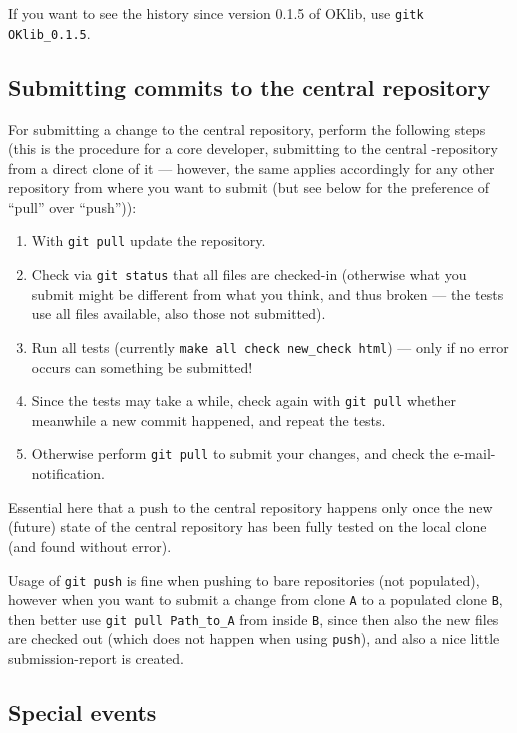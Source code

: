 \documentclass{book}
\begin{document}
If you want to see the history since version 0.1.5 of OKlib, use \texttt{gitk OKlib\_0.1.5}. 




\subsection{Submitting commits to the central repository}
\label{sec:GitSubmittingchanges}

For submitting a change to the central repository, perform the following steps (this is the procedure for a core developer, submitting to the central \OKlibrary-repository from a direct clone of it --- however, the same applies accordingly for any other repository from where you want to submit (but see below for the preference of ``pull'' over ``push'')):
\begin{enumerate}
\item With \texttt{git pull} update the repository.
\item Check via \texttt{git status} that all files are checked-in (otherwise what you submit might be different from what you think, and thus broken --- the tests use all files available, also those not submitted).
\item Run all tests (currently \texttt{make all check new\_check html}) --- only if no error occurs can something be submitted!
\item Since the tests may take a while, check again with \texttt{git pull} whether meanwhile a new commit happened, and repeat the tests.
\item Otherwise perform \texttt{git pull} to submit your changes, and check the e-mail-notification.
\end{enumerate}

Essential here that a push to the central repository happens only once the new (future) state of the central repository has been fully tested on the local clone (and found without error).

Usage of \texttt{git push} is fine when pushing to bare repositories (not populated), however when you want to submit a change from clone \texttt{A} to a populated clone \texttt{B}, then better use \texttt{git pull Path\_to\_A} from inside \texttt{B}, since then also the new files are checked out (which does not happen when using \texttt{push}), and also a nice little submission-report is created.




\subsection{Special events}
\label{sec:GitSpecialevents}
\end{document}
